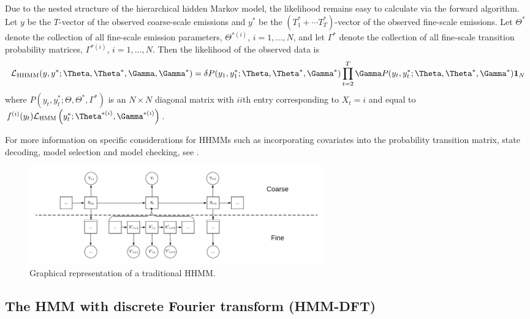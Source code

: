 Due to the nested structure of the hierarchical hidden Markov model, the likelihood remains easy to calculate via the forward algorithm.
%
Let $y$ be the $T$-vector of the observed coarse-scale emissions and
$y^*$ be the $(T_1^* + \cdots T_T^*)$-vector of the observed fine-scale emissions.
%
Let $\Theta^*$ denote the collection of all fine-scale emission parameters,
$\Theta^{*(i)}$, $i=1,\ldots, N$, and let $\Gamma^*$ denote the collection of all fine-scale transition probability matrices, $\Gamma^{*(i)}$, $i=1,\ldots, N$.
%
Then the likelihood of the observed data is
%
\[
\calL_{\text{HHMM}}(y,y^*;\Theta,\Theta^*,\Gamma,\Gamma^*) = \delta P(y_1,y_1^*;\Theta,\Theta^*,\Gamma^*) \prod_{t=2}^T \Gamma P(y_t,y_t^*;\Theta,\Theta^*,\Gamma^*) \mathbf{1}_N
\]
%
where $P(y_t,y_t^*;\Theta,\Theta^*,\Gamma^*)$ is an $N \times N$ diagonal matrix with $ii$th entry corresponding to $X_t=i$ and equal to 
$f^{(i)}(y_t)\calL_{\text{HMM}}\left(y_t^*;\Theta^{*(i)},
\Gamma^{*(i)}\right)$. 

For more information on specific considerations for HHMMs such as incorporating covariates into the probability transition matrix, state decoding, model selection and model checking, see \citep{Adam:2019}.

\begin{figure}[ht]
	\centering
	\includegraphics[width=5in]{../Plots/HHMM.png}
	\caption{Graphical representation of a traditional HHMM.}
	\label{fig:HHMM}
\end{figure}



\subsection{The HMM with discrete Fourier transform (HMM-DFT)}
\label{subsec:STFT}

